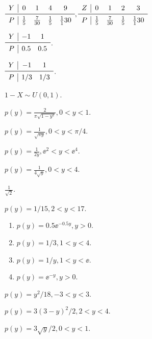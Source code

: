 \begin{answer}
  \item $\begin{array}{c|cccc}
    Y & 0 & 1 & 4 & 9 \\
    \midrule
    P & \frac15 & \frac7{30} & \frac15 & \frac11{30}
  \end{array},
  \begin{array}{c|cccc}
    Z & 0 & 1 & 2 & 3 \\
    \midrule
    P & \frac15 & \frac7{30} & \frac15 & \frac11{30}
  \end{array}$
  \item $\begin{array}{c|cc}
    Y & -1 & 1 \\
    \midrule
    P & 0.5 & 0.5
  \end{array}$.
  \item $\begin{array}{c|cc}
    Y & -1 & 1 \\
    \midrule
    P & 1/3 & 1/3
  \end{array}$.
  \item $1-X\sim U(0,1)$.
  \item $p(y)=\frac2{\pi\sqrt{1-y^2}},0<y<1$.
  \item $p(y)=\frac1{\sqrt{\pi y}},0<y<\pi/4$.
  \item $p(y)=\frac1{2y},\ee^2<y<\ee^4$.
  \item \begin{enumerate*}
    \item $p(y)=\frac1{4\sqrt y},0<y<4$.
    \item $\frac1{\sqrt2}$.
  \end{enumerate*}
  \item $p(y)=1/15,2<y<17$.
  \item \begin{enumerate}
    \item $p(y)=0.5\ee^{-0.5y},y>0$.
    \item $p(y)=1/3,1<y<4$.
    \item $p(y)=1/y,1<y<\ee$.
    \item $p(y)=\ee^{-y},y>0$.
  \end{enumerate}
  \item \begin{enumerate*}
    \item $p(y)=y^2/18,-3<y<3$.
    \item $p(y)=3(3-y)^2/2,2<y<4$.
    \item $p(y)=3\sqrt y/2,0<y<1$.
  \end{enumerate*}

\end{answer}
